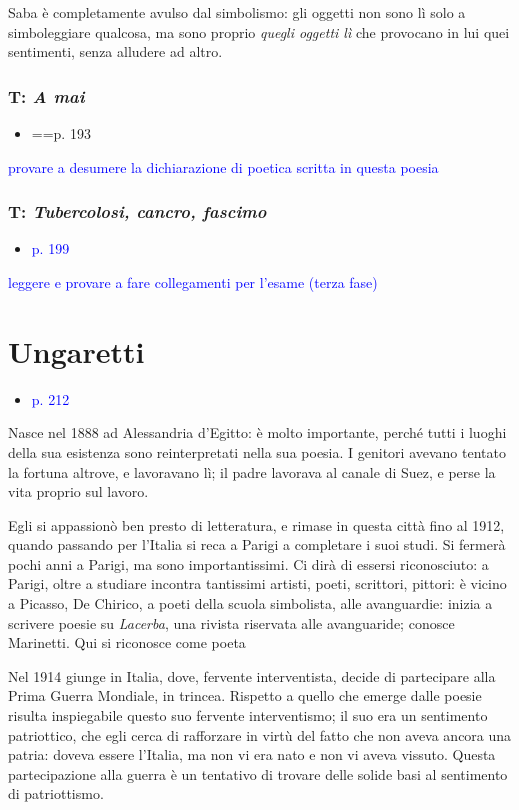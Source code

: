 \documentclass[a4paper, twoside, titlepage]{book}
\newcommand{\elenco}[1]{%
\begin{itemize}
#1
\end{itemize}}
\renewcommand{\emph}[1]{\textcolor{blue}{#1}}
\begin{document}
Saba è completamente avulso dal simbolismo: gli oggetti non sono lì solo a simboleggiare qualcosa, ma sono proprio \textit{quegli oggetti lì} che provocano in lui quei sentimenti, senza alludere ad altro.

\subsection{T: \textit{A mai}}
\elenco{\item ==p. 193}

\emph{provare a desumere la dichiarazione di poetica scritta in questa poesia}

\subsection{T: \textit{Tubercolosi, cancro, fascimo}}
\elenco{\item \emph{p. 199}}

\emph{leggere e provare a fare collegamenti per l'esame (terza fase)}

\chapter{Ungaretti}

\elenco{\item \emph{p. 212}}

Nasce nel 1888 ad Alessandria d'Egitto: è molto importante, perché tutti i luoghi della sua esistenza sono reinterpretati nella sua poesia.
I genitori avevano tentato la fortuna altrove, e lavoravano lì; il padre lavorava al canale di Suez, e perse la vita proprio sul lavoro.

Egli si appassionò ben presto di letteratura, e rimase in questa città fino al 1912, quando passando per l'Italia si reca a Parigi a completare i suoi studi.
Si fermerà pochi anni a Parigi, ma sono importantissimi. Ci dirà di essersi riconosciuto: a Parigi, oltre a studiare incontra tantissimi artisti, poeti, scrittori, pittori: è vicino a Picasso, De Chirico, a poeti della scuola simbolista, alle avanguardie: inizia a scrivere poesie su \textit{Lacerba}, una rivista riservata alle avanguaride; conosce Marinetti.
Qui si riconosce come poeta

Nel 1914 giunge in Italia, dove, fervente interventista, decide di partecipare alla Prima Guerra Mondiale, in trincea.
Rispetto a quello che emerge dalle poesie risulta inspiegabile questo suo fervente interventismo; il suo era un sentimento patriottico, che egli cerca di rafforzare in virtù del fatto che non aveva ancora una patria: doveva essere l'Italia, ma non vi era nato e non vi aveva vissuto.
Questa partecipazione alla guerra è un tentativo di trovare delle solide basi al sentimento di patriottismo.
\end{document}
